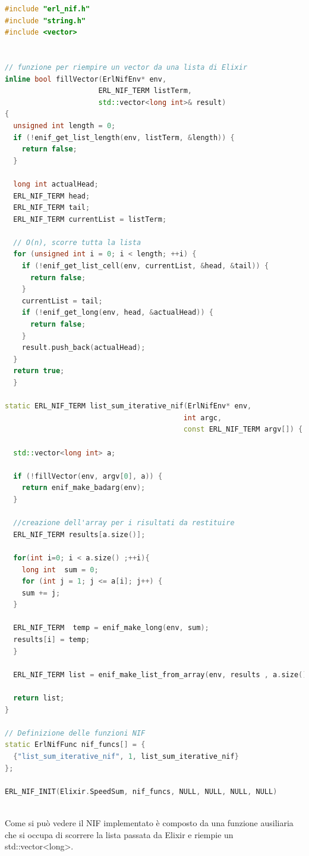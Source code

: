 \begin{lstlisting}[language=cpp,captionpos=b,
	caption={Funzione NIF},
	label={lst:list_sum_nif}]
#include "erl_nif.h" 
#include "string.h"
#include <vector>
	
	
// funzione per riempire un vector da una lista di Elixir
inline bool fillVector(ErlNifEnv* env,
                      ERL_NIF_TERM listTerm,
                      std::vector<long int>& result) 
{
  unsigned int length = 0;
  if (!enif_get_list_length(env, listTerm, &length)) {
    return false;
  }
	
  long int actualHead; 
  ERL_NIF_TERM head;
  ERL_NIF_TERM tail;
  ERL_NIF_TERM currentList = listTerm;
	
  // O(n), scorre tutta la lista
  for (unsigned int i = 0; i < length; ++i) {
    if (!enif_get_list_cell(env, currentList, &head, &tail)) {
      return false;
    }
    currentList = tail;
    if (!enif_get_long(env, head, &actualHead)) {
      return false;
    }
    result.push_back(actualHead);
  }
  return true;
  }
	
static ERL_NIF_TERM list_sum_iterative_nif(ErlNifEnv* env,
                                          int argc,
                                          const ERL_NIF_TERM argv[]) {
	
  std::vector<long int> a;
	
  if (!fillVector(env, argv[0], a)) {
    return enif_make_badarg(env);
  }
	
  //creazione dell'array per i risultati da restituire
  ERL_NIF_TERM results[a.size()];
	
  for(int i=0; i < a.size() ;++i){
    long int  sum = 0;
    for (int j = 1; j <= a[i]; j++) {
    sum += j;
  }

  ERL_NIF_TERM  temp = enif_make_long(env, sum);
  results[i] = temp;
  }

  ERL_NIF_TERM list = enif_make_list_from_array(env, results , a.size());
	
  return list;
}
	
// Definizione delle funzioni NIF
static ErlNifFunc nif_funcs[] = {
  {"list_sum_iterative_nif", 1, list_sum_iterative_nif}
};

ERL_NIF_INIT(Elixir.SpeedSum, nif_funcs, NULL, NULL, NULL, NULL)
	
\end{lstlisting}

Come si può vedere il NIF implementato è composto da una funzione
ausiliaria che si occupa di scorrere la lista
passata da Elixir e riempie un std::vector<long>.

